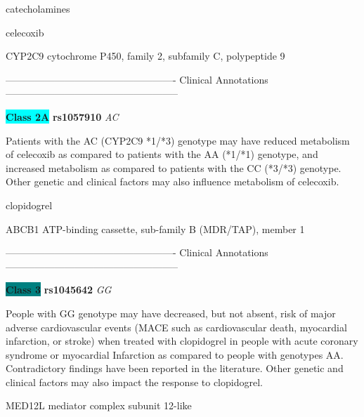 \documentclass{resume} %
\begin{document}
\begin{rSection}{ catecholamines }
\end{rSection}\begin{rSection}{ celecoxib }
\item[]

\begin{rSubsection}{ CYP2C9 }{ cytochrome P450, family 2, subfamily C, polypeptide 9 }{}{}
\item[]

\item[] ---------------------------------------------------- Clinical Annotations -----------------------------------------------------\newline
\item \textbf{\colorbox{cyan} {Class 2A}} \textbf{ rs1057910 } \textit{ AC }
\item[] Patients with the AC (CYP2C9 *1/*3) genotype may have reduced metabolism of celecoxib as compared to patients with the AA (*1/*1) genotype, and increased metabolism as compared to patients with the CC (*3/*3) genotype. Other genetic and clinical factors may also influence metabolism of celecoxib. 
\end{rSubsection}

\end{rSection}\begin{rSection}{ clopidogrel }
\item[]

\begin{rSubsection}{ ABCB1 }{ ATP-binding cassette, sub-family B (MDR/TAP), member 1 }{}{}
\item[]

\item[] ---------------------------------------------------- Clinical Annotations -----------------------------------------------------\newline
\item \textbf{\colorbox{teal} {Class 3}} \textbf{ rs1045642 } \textit{ GG }
\item[] People with GG  genotype may have decreased, but not absent, risk of major adverse cardiovascular events (MACE such as cardiovascular death, myocardial infarction, or stroke) when treated with clopidogrel in people with acute coronary syndrome or myocardial Infarction as compared to people with genotypes AA. Contradictory findings have been reported in the literature. Other genetic and clinical factors may also impact the response to clopidogrel.
\end{rSubsection}\begin{rSubsection}{ MED12L }{ mediator complex subunit 12-like }{}{}
\item[]


\end{rSubsection}
\end{rSection}
\end{document}
